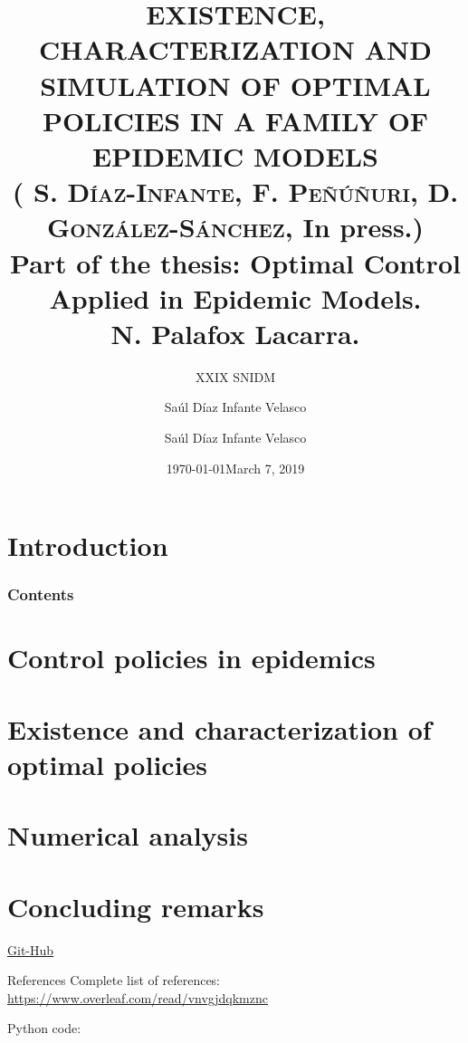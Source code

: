 \documentclass[10pt]{beamer}
\title{%
    EXISTENCE,
    CHARACTERIZATION AND SIMULATION OF OPTIMAL
    POLICIES IN A FAMILY OF EPIDEMIC MODELS
    \\
    \small{
        (%
        \textsc{%
            S. D\'iaz-Infante, %
            F. Pe\~n\'u\~nuri, %
            D. Gonz\'alez-S\'anchez,
        } In press.)
        \\%
        Part of the thesis:
        Optimal Control Applied in Epidemic Models.
        \\
        N. Palafox Lacarra.
        }{}
}
\subtitle{XXIX SNIDM}
\date{\today}
\author{Sa\'ul D\'iaz Infante Velasco}
\institute{CONACYT-Universidad de Sonora}
\author[Sa\'ul D\'iaz Infante Velasco]{
        Sa\'ul D\'iaz Infante Velasco
    }
\date[\ccbyncsa]{March 7, 2019 }
\begin{document}
    \begin{frame}[plain]
        \maketitle
    \end{frame}
    \section{Introduction}
        
        \begin{frame}
            \frametitle{Contents}
            \tableofcontents
        \end{frame}
    \section{Control policies in epidemics}
        
        
    \section{Existence and characterization of optimal policies}
        
        
    \section{Numerical analysis}
        
        
    \section{Concluding remarks}
        
%
%
    \begin{frame}
        \href{https://github.com/SaulDiazInfante/Beamer-xxIx-semana-unison-2019-10th-DynamicalSystemsAndControlWorkshop.git}{Git-Hub}
        \flushright
    \end{frame}
        \begin{frame}{References}
            Complete list of references:
            \href{https://www.overleaf.com/read/vnvgjdqkmznc
            }{https://www.overleaf.com/read/vnvgjdqkmznc}
            
            Python code:
            \nocite{python_repo}
            
            
        \end{frame}
\end{document}
